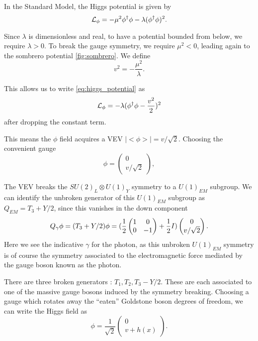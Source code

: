 In the Standard Model, the Higgs potential is given by
\begin{equation} \label{eq:higgs_potential}
\mathcal{L}_\phi = -\mu^2 \phi^\dagger \phi - \lambda (\phi^\dagger \phi)^2.
\end{equation}

Since $\lambda$ is dimensionless and real, to have a potential bounded from below, we require $\lambda > 0$.
To break the gauge symmetry, we require $\mu^2 < 0$, leading again to the sombrero potential \ref{fig:sombrero}.
We define
\begin{equation}
v^2 = - \frac{\mu^2}{\lambda}.
\end{equation}

This allows us to write \ref{eq:higgs_potential} as
\begin{equation} \label{eq:higgs_potential_rewritten}
\mathcal{L}_\phi = - \lambda (\phi^\dagger \phi - \frac{v^2}{2})^2
\end{equation}
after dropping the constant term.

This means the $\phi$ field acquires a VEV $|<\phi>| = v/\sqrt{2}$.
Choosing the convenient gauge
\begin{equation}
\phi = \begin{pmatrix} 0 \\ v/\sqrt{2} \end{pmatrix},
\end{equation}

The VEV breaks the $SU(2)_L \otimes U(1)_Y$ symmetry to a $U(1)_{EM}$ subgroup.
We can identify the unbroken generator of this $U(1)_{EM}$ subgroup as $Q_{EM} = T_3 + Y/2$, since this vanishes in the down component
\begin{equation}
Q_{\gamma} \phi = (T_3 + Y/2) \phi = (\frac{1}{2} \begin{pmatrix} 1 & 0 \\ 0 & -1 \end{pmatrix} + \frac{1}{2} I ) \begin{pmatrix} 0 \\ v/\sqrt{2} \end{pmatrix}.
\end{equation}
Here we see the indicative $\gamma$ for the photon, as this unbroken $U(1)_{EM}$ symmetry is of course the symmetry associated to the electromagnetic force mediated by the gauge boson known as the photon.

There are three broken generators : $T_1, T_2, T_3 - Y/2$.
These are each associated to one of the massive gauge bosons induced by the symmetry breaking.
Choosing a gauge which rotates away the ``eaten'' Goldstone boson degrees of freedom, we can write the Higgs field as
\begin{equation}
\label{eq:higgs_field}
\phi = \frac{1}{\sqrt{2}}\begin{pmatrix} 0 \\ v + h(x) \end{pmatrix}.
\end{equation}

